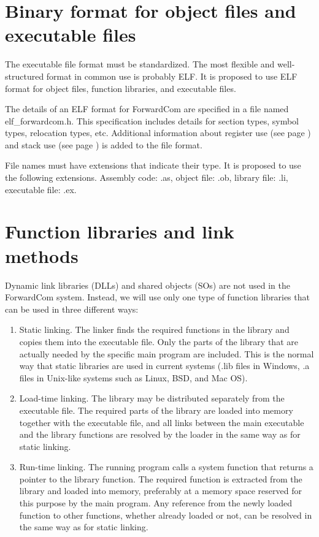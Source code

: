 \documentclass[forwardcom.tex]{subfiles}
\begin{document}
\RaggedRight

\section{Binary format for object files and executable files} \label{objectFileFormat}
The executable file format must be standardized. The most flexible and well-structured format in common use is probably ELF. It is proposed to use ELF format for object files, function libraries, and executable files. 
\vspace{2mm}

The details of an ELF format for ForwardCom are specified in a file named elf\_forwardcom.h. This specification includes details for section types, symbol types, relocation types, etc. Additional information about register use (see page \pageref{registerUsageConvention}) and stack use (see page \pageref{predictingStackSize}) is added to the file format. 
\vspace{2mm}

File names must have extensions that indicate their type. It is proposed to use the following extensions. Assembly code: .as, object file: .ob, library file: .li, executable file: .ex. 
\vspace{2mm}

\section{Function libraries and link methods} \label{libraryLinkMethods}
Dynamic link libraries (DLLs) and shared objects (SOs) are not used in the ForwardCom system. Instead, we will use only one type of function libraries that can be used in three different ways: 

\begin{enumerate}
\item Static linking. \label{staticLinking} The linker finds the required functions in the library and copies them into the executable file. Only the parts of the library that are actually needed by the specific main program are included. This is the normal way that static libraries are used in current systems (.lib files in Windows, .a files in Unix-like systems such as Linux, BSD, and Mac OS). 

\item  Load-time linking. \label{loadTimeLinking} The library may be distributed separately from the executable file. The required parts of the library are loaded into memory together with the executable file, and all links between the main executable and the library functions are resolved by the loader in the same way as for static linking. 

\item  Run-time linking. \label{runtimeLinking} The running program calls a system function that returns a pointer to 
the library function. The required function is extracted from the library and loaded into memory, preferably at a memory space reserved for this purpose by the main program. Any reference from the newly loaded function to other functions, whether already loaded or not, can be resolved in the same way as for static linking. 
\end{enumerate}
\end{document}
